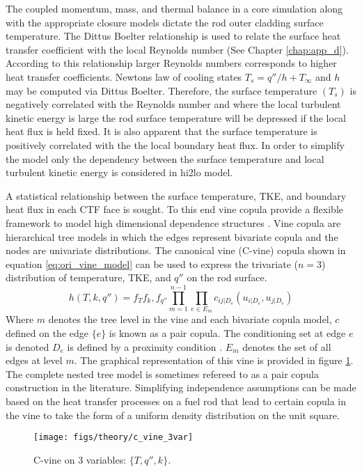 The coupled momentum, mass, and thermal balance in a core simulation along with the appropriate closure models dictate the rod outer cladding surface temperature.  The Dittus Boelter relationship is used to relate the surface heat transfer coefficient with the local Reynolds number (See Chapter \ref{chap:app_d}).  According to this relationship larger Reynolds numbers corresponds to higher heat transfer coefficients.   Newtons law of cooling states $T_s = q''/h + T_{\infty}$ and $h$ may be computed via Dittus Boelter.  Therefore, the surface temperature $(T_s)$ is negatively correlated with the Reynolds number and where the local turbulent kinetic energy is large the rod surface temperature will be depressed if the local heat flux is held fixed.  It is also apparent that the surface temperature is positively correlated with the the local boundary heat flux.  In order to simplify the model only the dependency between the surface temperature and local turbulent kinetic energy is considered in hi2lo model.

A statistical relationship between the surface temperature, TKE, and boundary heat flux in each CTF face is sought.  To this end vine copula provide a flexible framework to model high dimensional dependence structures \cite{Joe2015}. Vine copula are hierarchical tree models in which the edges represent bivariate copula and the nodes are univariate distributions.  The canonical vine (C-vine) copula shown in equation \ref{eq:ori_vine_model} can be used to express the trivariate ($n=3$) distribution of temperature, TKE, and $q''$ on the rod surface. 
\begin{equation}
h(T, k, q'') = f_T f_k, f_{q''} \prod_{m=1}^{n-1} \prod_{e \in E_m} c_{ij|D_e}(u_{i|D_e}, u_{j|D_e})
\label{eq:ori_vine_model}
\end{equation}
Where $m$ denotes the tree level in the vine and each bivariate copula model, $c$ defined on the edge $\{e\}$ is known as a pair copula.  The conditioning set at edge $e$ is denoted $D_e$ is defined by a proximity condition  \cite{bedford2001}. $E_m$ denotes the set of all edges at level $m$. The graphical representation of this vine is provided in figure \ref{fig:cvine3var}. The complete nested tree model is sometimes refereed to as a pair copula construction in the literature.  Simplifying independence assumptions can be made based on the heat transfer processes on a fuel rod that lead to certain copula in the vine to take the form of a uniform density distribution on the unit square.

\begin{figure}[H]
    \centering
    \texttt{[image: figs/theory/c\_vine\_3var]}
    \caption{C-vine on 3 variables: $\{T,q'',k\}$.}
    \label{fig:cvine3var}
\end{figure}


